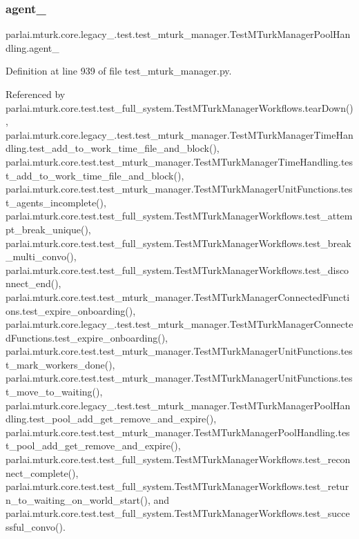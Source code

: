 \subsubsection{\texorpdfstring{agent\+\_}{agent\_2}}
{\footnotesize\ttfamily parlai.\+mturk.\+core.\+legacy\+\_.\+test.\+test\+\_\+mturk\+\_\+manager.\+Test\+M\+Turk\+Manager\+Pool\+Handling.\+agent\+\_}



Definition at line 939 of file test\+\_\+mturk\+\_\+manager.\+py.



Referenced by parlai.\+mturk.\+core.\+test.\+test\+\_\+full\+\_\+system.\+Test\+M\+Turk\+Manager\+Workflows.\+tear\+Down(), parlai.\+mturk.\+core.\+legacy\+\_.\+test.\+test\+\_\+mturk\+\_\+manager.\+Test\+M\+Turk\+Manager\+Time\+Handling.\+test\+\_\+add\+\_\+to\+\_\+work\+\_\+time\+\_\+file\+\_\+and\+\_\+block(), parlai.\+mturk.\+core.\+test.\+test\+\_\+mturk\+\_\+manager.\+Test\+M\+Turk\+Manager\+Time\+Handling.\+test\+\_\+add\+\_\+to\+\_\+work\+\_\+time\+\_\+file\+\_\+and\+\_\+block(), parlai.\+mturk.\+core.\+test.\+test\+\_\+mturk\+\_\+manager.\+Test\+M\+Turk\+Manager\+Unit\+Functions.\+test\+\_\+agents\+\_\+incomplete(), parlai.\+mturk.\+core.\+test.\+test\+\_\+full\+\_\+system.\+Test\+M\+Turk\+Manager\+Workflows.\+test\+\_\+attempt\+\_\+break\+\_\+unique(), parlai.\+mturk.\+core.\+test.\+test\+\_\+full\+\_\+system.\+Test\+M\+Turk\+Manager\+Workflows.\+test\+\_\+break\+\_\+multi\+\_\+convo(), parlai.\+mturk.\+core.\+test.\+test\+\_\+full\+\_\+system.\+Test\+M\+Turk\+Manager\+Workflows.\+test\+\_\+disconnect\+\_\+end(), parlai.\+mturk.\+core.\+test.\+test\+\_\+mturk\+\_\+manager.\+Test\+M\+Turk\+Manager\+Connected\+Functions.\+test\+\_\+expire\+\_\+onboarding(), parlai.\+mturk.\+core.\+legacy\+\_.\+test.\+test\+\_\+mturk\+\_\+manager.\+Test\+M\+Turk\+Manager\+Connected\+Functions.\+test\+\_\+expire\+\_\+onboarding(), parlai.\+mturk.\+core.\+test.\+test\+\_\+mturk\+\_\+manager.\+Test\+M\+Turk\+Manager\+Unit\+Functions.\+test\+\_\+mark\+\_\+workers\+\_\+done(), parlai.\+mturk.\+core.\+test.\+test\+\_\+mturk\+\_\+manager.\+Test\+M\+Turk\+Manager\+Unit\+Functions.\+test\+\_\+move\+\_\+to\+\_\+waiting(), parlai.\+mturk.\+core.\+legacy\+\_.\+test.\+test\+\_\+mturk\+\_\+manager.\+Test\+M\+Turk\+Manager\+Pool\+Handling.\+test\+\_\+pool\+\_\+add\+\_\+get\+\_\+remove\+\_\+and\+\_\+expire(), parlai.\+mturk.\+core.\+test.\+test\+\_\+mturk\+\_\+manager.\+Test\+M\+Turk\+Manager\+Pool\+Handling.\+test\+\_\+pool\+\_\+add\+\_\+get\+\_\+remove\+\_\+and\+\_\+expire(), parlai.\+mturk.\+core.\+test.\+test\+\_\+full\+\_\+system.\+Test\+M\+Turk\+Manager\+Workflows.\+test\+\_\+reconnect\+\_\+complete(), parlai.\+mturk.\+core.\+test.\+test\+\_\+full\+\_\+system.\+Test\+M\+Turk\+Manager\+Workflows.\+test\+\_\+return\+\_\+to\+\_\+waiting\+\_\+on\+\_\+world\+\_\+start(), and parlai.\+mturk.\+core.\+test.\+test\+\_\+full\+\_\+system.\+Test\+M\+Turk\+Manager\+Workflows.\+test\+\_\+successful\+\_\+convo().

